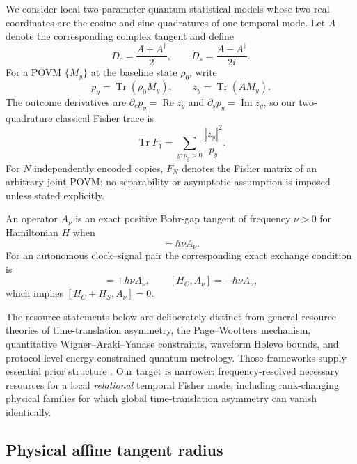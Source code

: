 \documentclass[aps,pra,preprint,nofootinbib]{revtex4-2}
\newcommand{\Tr}{\operatorname{Tr}}
\newcommand{\rhozero}{\rho_0}
\newcommand{\Fcl}{F}
\begin{document}
We consider local two-parameter quantum statistical models whose two real coordinates are the cosine and sine quadratures of one temporal mode.  Let $A$ denote the corresponding complex tangent and define
\begin{equation}
D_c=\frac{A+A^\dagger}{2},\qquad
D_s=\frac{A-A^\dagger}{2i}.
\label{eq:quadratures}
\end{equation}
For a POVM $\{M_y\}$ at the baseline state $\rhozero$, write
\begin{equation}
p_y=\Tr(\rhozero M_y),\qquad z_y=\Tr(A M_y).
\end{equation}
The outcome derivatives are $\partial_c p_y=\operatorname{Re}z_y$ and $\partial_s p_y=\operatorname{Im}z_y$, so our two-quadrature classical Fisher trace is
\begin{equation}
\Tr \Fcl_1=\sum_{y:p_y>0}\frac{|z_y|^2}{p_y}.
\label{eq:FItrace}
\end{equation}
For $N$ independently encoded copies, $\Fcl_N$ denotes the Fisher matrix of an arbitrary joint POVM; no separability or asymptotic assumption is imposed unless stated explicitly.

An operator $A_\nu$ is an exact positive Bohr-gap tangent of frequency $\nu>0$ for Hamiltonian $H$ when
\begin{equation}
[H,A_\nu]=\hbar\nu A_\nu.
\label{eq:bohrgap}
\end{equation}
For an autonomous clock--signal pair the corresponding exact exchange condition is
\begin{equation}
[H_S,A_\nu]=+\hbar\nu A_\nu,
\qquad
[H_C,A_\nu]=-\hbar\nu A_\nu,
\label{eq:exchange}
\end{equation}
which implies $[H_C+H_S,A_\nu]=0$.

The resource statements below are deliberately distinct from general resource theories of time-translation asymmetry, the Page--Wootters mechanism, quantitative Wigner--Araki--Yanase constraints, waveform Holevo bounds, and protocol-level energy-constrained quantum metrology.  Those frameworks supply essential prior structure \cite{PageWootters1983,MarvianSpekkens2014Modes,CarmoSoaresPinto2021,TajimaShiraishiSaito2020,Marvian2022,YamaguchiTajima2023,GardnerEtAl2024,ChenYang2026}.  Our target is narrower: frequency-resolved necessary resources for a local \emph{relational} temporal Fisher mode, including rank-changing physical families for which global time-translation asymmetry can vanish identically.

\subsection{Physical affine tangent radius}
\end{document}
